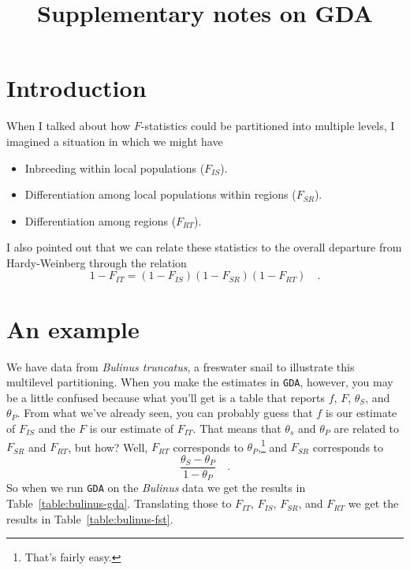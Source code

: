 \documentclass[12pt]{article}
\title{Supplementary notes on GDA}
\begin{document}
\maketitle

\thispagestyle{first}

\section*{Introduction}

When I talked about how $F$-statistics could be partitioned into
multiple levels, I imagined a situation in which we might have

\begin{itemize}

\item Inbreeding within local populations ($F_{IS}$).

\item Differentiation among local populations within regions
  ($F_{SR}$).

\item Differentiation among regions ($F_{RT}$).

\end{itemize}

\noindent I also pointed out that we can relate these statistics to
the overall departure from Hardy-Weinberg through the relation
\[
1-F_{IT} = (1-F_{IS})(1-F_{SR})(1-F_{RT}) \quad .
\]

\section*{An example}

We have data from {\it Bulinus truncatus\/}, a freswater snail to
illustrate this multilevel partitioning. When you make the estimates
in {\tt GDA}, however, you may be a little confused because what
you'll get is a table that reports $f$, $F$, $\theta_S$, and
$\theta_P$. From what we've already seen, you can probably guess that
$f$ is our estimate of $F_{IS}$ and the $F$ is our estimate of
$F_{IT}$. That means that $\theta_s$ and $\theta_P$ are related to
$F_{SR}$ and $F_{RT}$, but how? Well, $F_{RT}$ corresponds to
$\theta_P$,\footnote{That's fairly easy.} and $F_{SR}$ corresponds to 
\[
\frac{\theta_S - \theta_P}{1 - \theta_P} \quad .
\]
So when we run {\tt GDA} on the {\it Bulinus\/} data we get the
results in Table~\ref{table:bulinus-gda}. Translating those to
$F_{IT}$, $F_{IS}$, $F_{SR}$, and $F_{RT}$ we get the results in
Table~\ref{table:bulinus-fst}.
\end{document}
